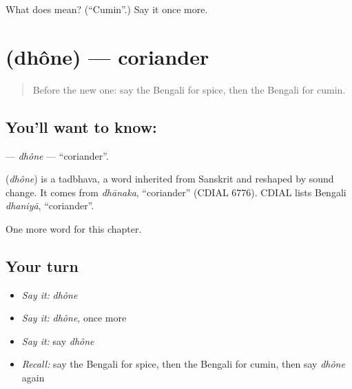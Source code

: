 \begin{tcolorbox}[breakable,colback=teal!4,colframe=teal!35!black,title={Before you move on}]
What does  mean? (\textquotedblleft{}Cumin\textquotedblright{}.) Say it once more.
\end{tcolorbox}
\section[\texorpdfstring{\bn{ধনে} (dhône)}{ধনে (dhône)}]{ (dhône) — coriander}

\label{lesson:BN-C249-dhone}



\begin{quote}
Before the new one: say the Bengali for spice, then the Bengali for cumin.
\end{quote}

\subsection*{You'll want to know: }
\textbf{} — \emph{dhône} — \textquotedblleft{}coriander\textquotedblright{}.

\begin{cousinweb}
\textbf{} (\emph{dhône}) is a tadbhava, a word inherited from Sanskrit and reshaped by sound change. It comes from \emph{dhānaka}, \textquotedblleft{}coriander\textquotedblright{} (CDIAL 6776). CDIAL lists Bengali \emph{dhaniyā}, \textquotedblleft{}coriander\textquotedblright{}.
\end{cousinweb}

\begin{grammarlens}[title={What you've built}]
One more word for this chapter.
\end{grammarlens}

\subsection*{Your turn}
\begin{itemize}
\raggedright
  \item \emph{Say it:} \emph{dhône}
  \item \emph{Say it:} \emph{dhône}, once more
  \item \emph{Say it:} say \emph{dhône}
  \item \emph{Recall:} say the Bengali for spice, then the Bengali for cumin, then say \emph{dhône} again
\end{itemize}

